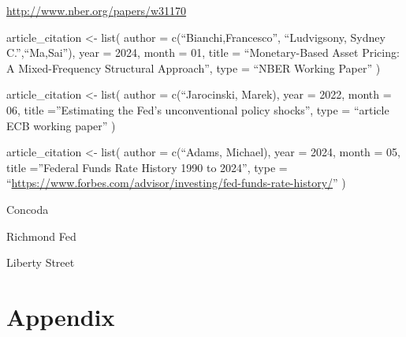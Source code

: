 \documentclass[
]{article}
\begin{document}
\url{http://www.nber.org/papers/w31170}

article\_citation \textless- list(
author = c(``Bianchi,Francesco'', ``Ludvigsony, Sydney C.'',``Ma,Sai''),
year = 2024,
month = 01,
title = ``Monetary-Based Asset Pricing: A Mixed-Frequency Structural
Approach'',
type = ``NBER Working Paper''
)

article\_citation \textless- list(
author = c(``Jarocinski, Marek),
year = 2022,
month = 06,
title =''Estimating the Fed's unconventional policy shocks'',
type = ``article ECB working paper''
)

article\_citation \textless- list(
author = c(``Adams, Michael),
year = 2024,
month = 05,
title =''Federal Funds Rate History 1990 to 2024'',
type = ``\url{https://www.forbes.com/advisor/investing/fed-funds-rate-history/}''
)

Concoda

Richmond Fed

Liberty Street

\hypertarget{appendix}{%
\section{Appendix}\label{appendix}}
\end{document}
